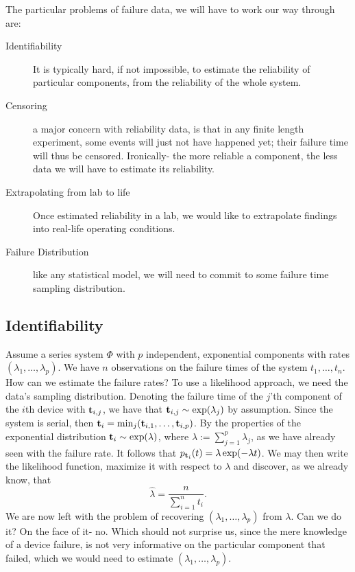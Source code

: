 The particular problems of failure data, we will have to work our way through are:
\begin{description}
\item [Identifiability] It is typically hard, if not impossible, to estimate the reliability of particular components, from the reliability of the whole system. 
\item [Censoring] a major concern with reliability data, is that in any finite length experiment, some events will just not have happened yet; their failure time will thus be censored. Ironically- the more reliable a component, the less data we will have to estimate its reliability. 
\item [Extrapolating from lab to life] Once estimated reliability in a lab, we would like to extrapolate findings into real-life operating conditions.
\item [Failure Distribution] like any statistical model, we will need to commit to some failure time sampling distribution.
\end{description}


\subsection{Identifiability}

\begin{example}
\label{eg:likelihood_of_failures}
Assume a series system $\Phi$ with $p$ independent, exponential components with rates $(\lambda_1,\dots,\lambda_p)$.
We have $n$ observations on the failure times of the system $t_1,\dots,t_n$.
How can we estimate the failure rates?
To use a likelihood approach, we need the data's sampling distribution.
Denoting the failure time of the $j$'th component of the $i$th device with $\mathbf{t}_{i,j}$, we have that $\mathbf{t}_{i,j}\sim \exp(\lambda_j)$ by assumption.
Since the system is serial, then $\mathbf{t}_i=\min_j(\mathbf{t}_{i,1},\dots,\mathbf{t}_{i,p})$.
By the properties of the exponential distribution $\mathbf{t}_i \sim \exp(\lambda)$, where $\lambda:=\sum_{j=1}^{p} \lambda_j$, as we have already seen with the failure rate. It follows that
$p_{\mathbf{t}_i} (t)=\lambda \exp(-\lambda t)$.
We may then write the likelihood function, maximize it with respect to $\lambda$ and discover, as we already know, that $$\hat{\lambda}=\frac{n}{\sum_{i=1}^{n} t_i}.$$
We are now left with the problem of recovering $(\lambda_1,\dots,\lambda_p)$ from $\lambda$. 
Can we do it? On the face of it- no. Which should not surprise us, since the mere knowledge of a device failure, is not very informative on the particular component that failed, which we would need to estimate $(\lambda_1,\dots,\lambda_p)$.
\end{example}


